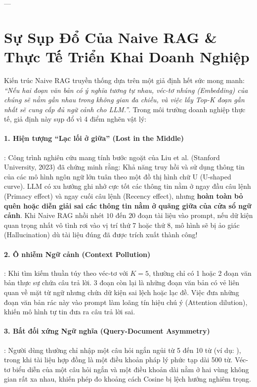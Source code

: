 ---

\section{Sự Sụp Đổ Của Naive RAG \& Thực Tế Triển Khai Doanh Nghiệp}
\label{sec:naive-rag-failure}

Kiến trúc Naive RAG truyền thống dựa trên một giả định hết sức mong manh: \textit{``Nếu hai đoạn văn bản có ý nghĩa tương tự nhau, véc-tơ nhúng (Embedding) của chúng sẽ nằm gần nhau trong không gian đa chiều, và việc lấy Top-K đoạn gần nhất sẽ cung cấp đủ ngữ cảnh cho LLM.''}. Trong môi trường doanh nghiệp thực tế, giả định này sụp đổ vì 4 điểm nghẽn vật lý:

\paragraph{1. Hiện tượng ``Lạc lối ở giữa'' (Lost in the Middle)}:
Công trình nghiên cứu mang tính bước ngoặt của Liu et al. (Stanford University, 2023) đã chứng minh rằng: Khả năng truy hồi và sử dụng thông tin của các mô hình ngôn ngữ lớn tuân theo một đồ thị hình chữ U (U-shaped curve). LLM có xu hướng ghi nhớ cực tốt các thông tin nằm ở ngay đầu câu lệnh (Primacy effect) và ngay cuối câu lệnh (Recency effect), nhưng \textbf{hoàn toàn bỏ quên hoặc diễn giải sai các thông tin nằm ở quãng giữa của cửa sổ ngữ cảnh}. Khi Naive RAG nhồi nhét $10$ đến $20$ đoạn tài liệu vào prompt, nếu dữ kiện quan trọng nhất vô tình rơi vào vị trí thứ 7 hoặc thứ 8, mô hình sẽ bị ảo giác (Hallucination) dù tài liệu đúng đã được trích xuất thành công!

\paragraph{2. Ô nhiễm Ngữ cảnh (Context Pollution)}:
Khi tìm kiếm thuần túy theo véc-tơ với $K=5$, thường chỉ có 1 hoặc 2 đoạn văn bản thực sự chứa câu trả lời. 3 đoạn còn lại là những đoạn văn bản có vẻ liên quan về mặt từ ngữ nhưng chứa dữ kiện sai lệch hoặc lạc đề. Việc đưa những đoạn văn bản rác này vào prompt làm loãng tín hiệu chú ý (Attention dilution), khiến mô hình tự tin đưa ra câu trả lời sai.

\paragraph{3. Bất đối xứng Ngữ nghĩa (Query-Document Asymmetry)}:
Người dùng thường chỉ nhập một câu hỏi ngắn ngủi từ 5 đến 10 từ (ví dụ: ), trong khi tài liệu hợp đồng là một điều khoản pháp lý phức tạp dài 500 từ. Véc-tơ biểu diễn của một câu hỏi ngắn và một điều khoản dài nằm ở hai vùng không gian rất xa nhau, khiến phép đo khoảng cách Cosine bị lệch hướng nghiêm trọng.

